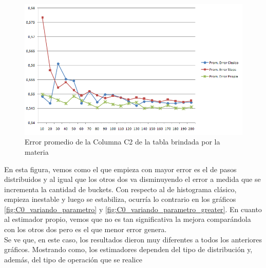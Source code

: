 \begin{itemize}
\begin{figure}[H]
	  \begin{center}
	    \includegraphics[scale=.80]{imagenes/parametroVariableC2Greater.png}
	    \caption{Error promedio de la Columna C2 de la tabla brindada por la materia} 
	    \label{fig:C2_variando_paremetro_greater}
	  \end{center}
\end{figure}

\quad En esta figura, vemos como el que empieza con mayor error es el de pasos distribuidos y al igual que los otros dos va disminuyendo el error a medida que se incrementa la cantidad de buckets. Con respecto al de histograma cl\'asico, empieza inestable y luego se estabiliza, ocurr\'ia lo contrario en los gr\'aficos \ref{fig:C0_variando_parametro} y \ref{fig:C0_variando_parametro_greater}. En cuanto al estimador propio, vemos que no es tan significativa la mejora compar\'andola con los otros dos pero es el que menor error genera. \\

\quad Se ve que, en este caso, los resultados dieron muy diferentes a todos los anteriores gr\'aficos. Mostrando como, los estimadores dependen del tipo de distribuci\'on y, adem\'as, del tipo de operaci\'on que se realice \\

\end{itemize}